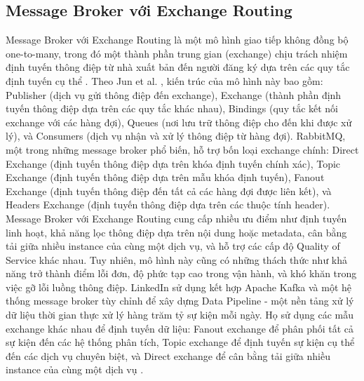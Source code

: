 \subsection{Message Broker với Exchange Routing}
Message Broker với Exchange Routing là một mô hình giao tiếp không đồng bộ one-to-many, trong đó một thành phần trung gian (exchange) chịu trách nhiệm định tuyến thông điệp từ nhà xuất bản đến người đăng ký dựa trên các quy tắc định tuyến cụ thể \cite{hohpe2004}.
Theo Jun et al. \cite{jun2018}, kiến trúc của mô hình này bao gồm: Publisher (dịch vụ gửi thông điệp đến exchange), Exchange (thành phần định tuyến thông điệp dựa trên các quy tắc khác nhau), Bindings (quy tắc kết nối exchange với các hàng đợi), Queues (nơi lưu trữ thông điệp cho đến khi được xử lý), và Consumers (dịch vụ nhận và xử lý thông điệp từ hàng đợi).
RabbitMQ, một trong những message broker phổ biến, hỗ trợ bốn loại exchange chính: Direct Exchange (định tuyến thông điệp dựa trên khóa định tuyến chính xác), Topic Exchange (định tuyến thông điệp dựa trên mẫu khóa định tuyến), Fanout Exchange (định tuyến thông điệp đến tất cả các hàng đợi được liên kết), và Headers Exchange (định tuyến thông điệp dựa trên các thuộc tính header).
Message Broker với Exchange Routing cung cấp nhiều ưu điểm như định tuyến linh hoạt, khả năng lọc thông điệp dựa trên nội dung hoặc metadata, cân bằng tải giữa nhiều instance của cùng một dịch vụ, và hỗ trợ các cấp độ Quality of Service khác nhau. Tuy nhiên, mô hình này cũng có những thách thức như khả năng trở thành điểm lỗi đơn, độ phức tạp cao trong vận hành, và khó khăn trong việc gỡ lỗi luồng thông điệp.
LinkedIn sử dụng kết hợp Apache Kafka và một hệ thống message broker tùy chỉnh để xây dựng Data Pipeline - một nền tảng xử lý dữ liệu thời gian thực xử lý hàng trăm tỷ sự kiện mỗi ngày. Họ sử dụng các mẫu exchange khác nhau để định tuyến dữ liệu: Fanout exchange để phân phối tất cả sự kiện đến các hệ thống phân tích, Topic exchange để định tuyến sự kiện cụ thể đến các dịch vụ chuyên biệt, và Direct exchange để cân bằng tải giữa nhiều instance của cùng một dịch vụ \cite{goodhope2012}.
